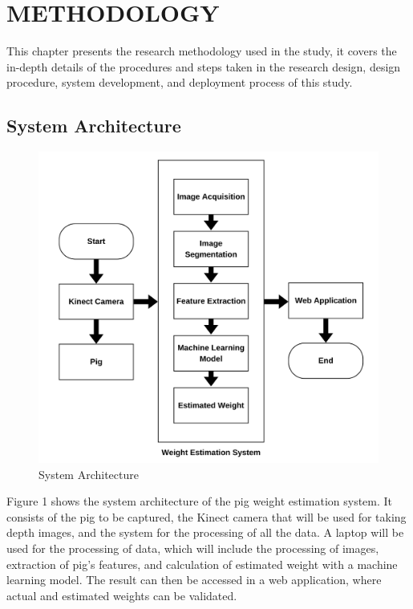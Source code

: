 \chapter{METHODOLOGY}
{\baselineskip
	
This chapter presents the research methodology used in the study, it covers the in-depth details of the procedures and steps taken in the research design, design procedure, system development, and deployment process of this study.


\section { System Architecture}

\begin{figure}[h]
	\centering
	\includegraphics[height=0.5\textheight]{figures/Architectureofniggas}
	\caption{System Architecture}
	\label{fig:System Architecture}
\end{figure}

Figure 1 shows the system architecture of the pig weight estimation system. It consists of the pig to be captured, the Kinect camera that will be used for taking depth images, and the system for the processing of all the data. A laptop will be used for the processing of data, which will include the processing of images, extraction of pig’s features, and calculation of estimated weight with a machine learning model. The result can then be accessed in a web application, where actual and estimated weights can be validated.

}
